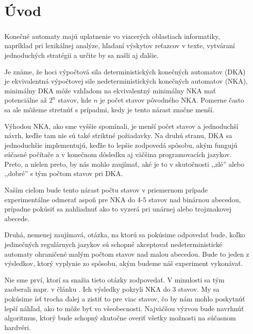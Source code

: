 \chapter{Úvod}
\paragraph{}
Konečné automaty majú uplatnenie vo viacerých oblastiach informatiky, napríklad pri lexikálnej analýze, hľadaní výskytov reťazcov v texte, vytváraní jednoduchých stratégii a určite by sa našli aj ďalšie.

Je známe, že hoci výpočtová sila deterministických konečných automatov (DKA) je ekvivalentná výpočtovej sile nedeterministických konečných automatov (NKA), minimálny DKA môže vzhľadom na ekvivalentný minimálny NKA mať potenciálne až $2^n$ stavov, kde $n$ je počet stavov pôvodného NKA. Pomerne často sa ale môžeme stretnúť s prípadmi, kedy je tento nárast značne menší.

Výhodou NKA, ako sme vyššie spomínali, je menší počet stavov a jednoduchší návrh, keďže tam nie sú také striktné požiadavky. Na druhú stranu, DKA sa jednoduchšie implementujú, keďže to lepšie zodpovedá spôsobu, akým fungujú súčasné počítače a v konečnom dôsledku aj väčšina programovacích jazykov. Preto, a nielen preto, by nás mohlo zaujímať, aké je to v skutočnosti ,,zlé'' alebo ,,dobré'' s tým počtom stavov pri DKA. 

Naším cieľom bude tento nárast počtu stavov v priemernom prípade experimentálne odmerať aspoň pre NKA do 4-5 stavov nad binárnou abecedou, prípadne pokúsiť sa nahliadnuť ako to vyzerá pri unárnej alebo trojznakovej abecede.

Druhá, nemenej zaujímavá, otázka, na ktorú sa pokúsime odpovedať bude, koľko jedinečných regulárnych jazykov sú schopné akceptovať nedeterministické automaty ohraničené malým počtom stavov nad malou abecedou. Bude to jeden z výsledkov, ktorý vyplynie zo spôsobu, akým budeme náš experiment vykonávať.

Nie sme prví, ktorí sa snažia tieto otázky zodpovedať. V minulosti sa tým zaoberali napr. v článku \cite{shallit}. Ich výsledky pokryli NKA do 3 stavov. My sa pokúsime ísť trocha ďalej a zistiť to pre viac stavov, čo by nám mohlo poskytnúť lepší náhľad, ako to môže byť vo všeobecnosti. Najväčšou výzvou bude navrhnúť algoritmus, ktorý bude schopný skutočne overiť všetky možnosti na súčasnom hardvéri.


